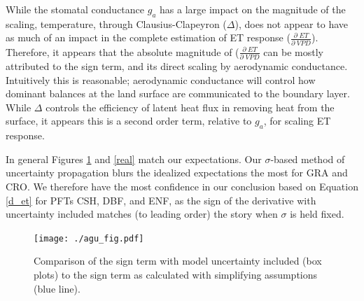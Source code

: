 \documentclass[draft,linenumbers]{agujournal}
\begin{document}
While the stomatal conductance $g_a$ has a large impact on the magnitude of the scaling, temperature, through Clausius-Clapeyron ($\Delta$), does not appear to have as much of an impact in the complete estimation of ET response ($\frac{\partial \; ET}{\partial \; VPD}$). Therefore, it appears that the absolute magnitude of ($\frac{\partial \; ET}{\partial \; VPD}$ can be mostly attributed to the sign term, and its direct scaling by aerodynamic conductance. Intuitively this is reasonable; aerodynamic conductance will control how dominant balances at the land surface are communicated to the boundary layer. While $\Delta$ controls the efficiency of latent heat flux in removing heat from the surface, it appears this is a second order term, relative to $g_a$, for scaling ET response. 

In general Figures \ref{agu_fig} and \ref{real} match our expectations. Our $\sigma$-based method of uncertainty propagation blurs the idealized expectations the most for GRA and CRO. We therefore have the most confidence in our conclusion based on Equation \ref{d_et} for PFTs CSH, DBF, and ENF, as the sign of the derivative with uncertainty included matches (to leading order) the story when $\sigma$ is held fixed.

\begin{figure}[h]
\centering
\texttt{[image: ./agu\_fig.pdf]}
\caption{Comparison of the sign term with model uncertainty included (box plots) to the sign term as calculated with simplifying assumptions (blue line).}
\label{agu_fig}
\end{figure}
\end{document}
